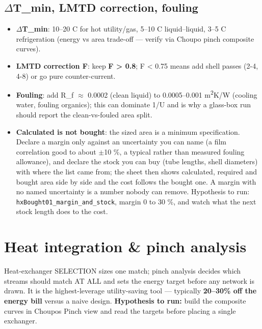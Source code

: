 \documentclass[11pt,a4paper]{article}
\providecommand{\tightlist}{\setlength{\itemsep}{0pt}\setlength{\parskip}{0pt}}
\begin{document}
\hypertarget{ux3b4t_min-lmtd-correction-fouling}{%
\subsection{\(\Delta\)T\_min, LMTD correction,
fouling}\label{ux3b4t_min-lmtd-correction-fouling}}

\begin{itemize}
\tightlist
\item
  \textbf{\(\Delta\)T\_min}: 10--20 \textdegree{}C for hot utility/gas, 5--10 \textdegree{}C
  liquid--liquid, 3--5 \textdegree{}C refrigeration (energy vs area trade-off ---
  verify via Choupo pinch composite curves).
\item
  \textbf{LMTD correction F}: keep \textbf{F \textgreater{} 0.8}; F
  \textless{} 0.75 means add shell passes (2-4, 4-8) or go pure
  counter-current.
\item
  \textbf{Fouling}: add R\_f \(\approx\) 0.0002 (clean liquid) to 0.0005--0.001
  m\textsuperscript{2}K/W (cooling water, fouling organics); this can dominate 1/U and is
  why a glass-box run should report the clean-vs-fouled area split.
\item
  \textbf{Calculated is not bought}: the sized area is a minimum
  specification. Declare a margin only against an uncertainty you can name
  (a film correlation good to about \(\pm\)10 \%, a typical rather than measured
  fouling allowance), and declare the stock you can buy (tube lengths, shell
  diameters) with where the list came from; the sheet then shows calculated,
  required and bought area side by side and the cost follows the bought one.
  A margin with no named uncertainty is a number nobody can remove. Hypothesis
  to run: \texttt{hxBought01\_margin\_and\_stock}, margin 0 to 30 \%, and watch
  what the next stock length does to the cost.
\end{itemize}

\hypertarget{heat-integration--pinch-analysis}{%
\section{Heat integration \& pinch
analysis}\label{heat-integration--pinch-analysis}}

Heat-exchanger SELECTION sizes one match; pinch analysis decides which
streams should match AT ALL and sets the energy target before any
network is drawn. It is the highest-leverage utility-saving tool ---
typically \textbf{20--30\% off the energy bill} versus a naive design.
\textbf{Hypothesis to run:} build the composite curves in
Choupo\textquotesingle s Pinch view and read the targets before placing
a single exchanger.
\end{document}
